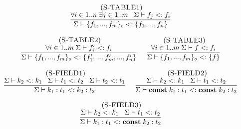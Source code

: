 \[
\begin{array}{c}
\begin{array}{c}
\; (\textsc{S-TABLE1})\\
\dfrac{\forall i \in 1..n \; \exists j \in 1..m \;\;\;
       \Sigma \vdash f_{j} <: f_{i}}
      {\Sigma \vdash \{f_{1}, ..., f_{m}\}_{c} <: \{f_{1}, ..., f_{n}\}}
\end{array}
\\ \\
\begin{array}{c}
\; (\textsc{S-TABLE2})\\
\dfrac{\forall i \in 1..m \; \Sigma \vdash f_{i}' <: f_{i}}
      {\Sigma \vdash \{f_{1}, ..., f_{m}\}_{o} <: \{f_{1}', ..., f_{m}', ..., f_{n}'\}}
\end{array}
\;
\begin{array}{c}
\; (\textsc{S-TABLE3})\\
\dfrac{\forall i \in 1..m \; \Sigma \vdash f <: f_{i}}
      {\Sigma \vdash \{f_{1}, ..., f_{m}\}_{o} <: \{f\}} 
\end{array}
\\ \\
\begin{array}{c}
\; (\textsc{S-FIELD1})\\
\dfrac{\Sigma \vdash k_{2} <: k_{1} \;\;\;
       \Sigma \vdash t_{1} <: t_{2} \;\;\;
       \Sigma \vdash t_{2} <: t_{1}}
      {\Sigma \vdash k_{1}:t_{1} <: k_{2}:t_{2}}
\end{array}
\;
\begin{array}{c}
\; (\textsc{S-FIELD2})\\
\dfrac{\Sigma \vdash k_{2} <: k_{1} \;\;\;
       \Sigma \vdash t_{1} <: t_{2}}
      {\Sigma \vdash \mathbf{const} \; k_{1}:t_{1} <: \mathbf{const} \; k_{2}:t_{2}}
\end{array}
\\ \\
\begin{array}{c}
\; (\textsc{S-FIELD3})\\
\dfrac{\Sigma \vdash k_{2} <: k_{1} \;\;\;
       \Sigma \vdash t_{1} <: t_{2}}
      {\Sigma \vdash k_{1}:t_{1} <: \mathbf{const} \; k_{2}:t_{2}}
\end{array}
\end{array}
\]

